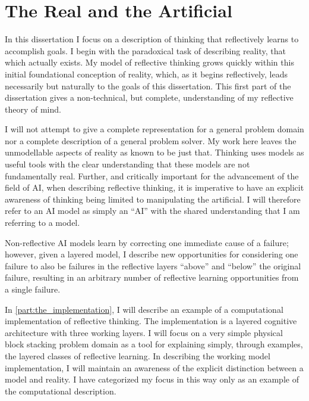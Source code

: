 \chapter{The Real and the Artificial}
\label{chapter:the_real_and_the_artificial}

In this dissertation I focus on a description of thinking that
reflectively learns to accomplish goals.  I begin with the paradoxical
task of describing reality, that which actually exists.  My model of
reflective thinking grows quickly within this initial foundational
conception of reality, which, as it begins reflectively, leads
necessarily but naturally to the goals of this dissertation.  This
first part of the dissertation gives a non-technical, but complete,
understanding of my reflective theory of mind.

I will not attempt to give a complete representation for a general
problem domain nor a complete description of a general problem solver.
My work here leaves the unmodellable aspects of reality as known to be
just that.  Thinking uses models as useful tools with the clear
understanding that these models are not fundamentally real.  Further,
and critically important for the advancement of the field of AI, when
describing reflective thinking, it is imperative to have an explicit
awareness of thinking being limited to manipulating the artificial.  I
will therefore refer to an AI model as simply an ``AI'' with the
shared understanding that I am referring to a model.

Non-reflective AI models learn by correcting one immediate cause of a
failure; however, given a layered model, I describe new opportunities
for considering one failure to also be failures in the reflective
layers ``above'' and ``below'' the original failure, resulting in an
arbitrary number of reflective learning opportunities from a single
failure.

In \autoref{part:the_implementation}, I will describe an example of a
computational implementation of reflective thinking.  The
implementation is a layered cognitive architecture with three working
layers.  I will focus on a very simple physical block stacking problem
domain as a tool for explaining simply, through examples, the layered
classes of reflective learning.  In describing the working model
implementation, I will maintain an awareness of the explicit
distinction between a model and reality.  I have categorized my focus
in this way only as an example of the computational description.

